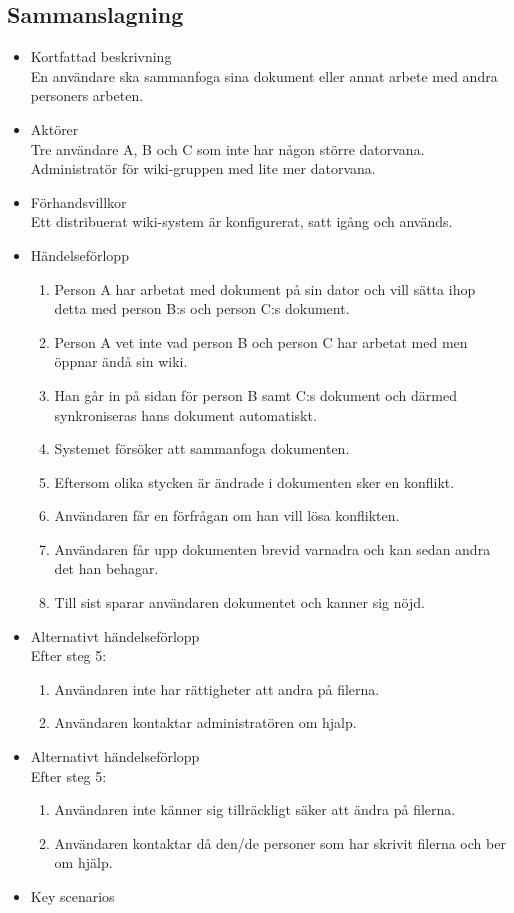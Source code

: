 \subsection{Sammanslagning}
\begin{itemize}
	\item Kortfattad beskrivning
	\\En användare ska sammanfoga sina dokument eller annat arbete med andra personers arbeten.
	\item Aktörer
	\\Tre användare A, B och C som inte har någon större datorvana.
	\\Administratör för wiki-gruppen med lite mer datorvana.	
	\item Förhandsvillkor
	\\Ett distribuerat wiki-system är konfigurerat, satt igång och används.
	\item Händelseförlopp
	\begin{enumerate}
		\item Person A har arbetat med dokument på sin dator och vill sätta ihop detta med person B:s och person C:s dokument.
		\item Person A vet inte vad person B och person C har arbetat med men öppnar ändå sin wiki.
		\item Han går in på sidan för person B samt C:s dokument och därmed synkroniseras hans dokument automatiskt.
		\item Systemet försöker att sammanfoga dokumenten.
		\item Eftersom olika stycken är ändrade i dokumenten sker en konflikt.
		\item Användaren får en förfrågan om han vill lösa konflikten.
		\item Användaren får upp dokumenten brevid varnadra och kan sedan andra det han behagar.
		\item Till sist sparar användaren dokumentet och kanner sig nöjd.
	\end{enumerate}
	\item Alternativt händelseförlopp
	\\Efter steg 5:
	\begin{enumerate}	
		\item Användaren inte har rättigheter att andra på filerna.
		\item Användaren kontaktar administratören om hjalp.
	\end{enumerate}	
	\item Alternativt händelseförlopp
	\\Efter steg 5: 
	\begin{enumerate}	
		\item Användaren inte känner sig tillräckligt säker att ändra på filerna.
		\item Användaren kontaktar då den/de personer som har skrivit filerna och ber om hjälp.
	\end{enumerate}
	\item Key scenarios
	

\end{itemize}
